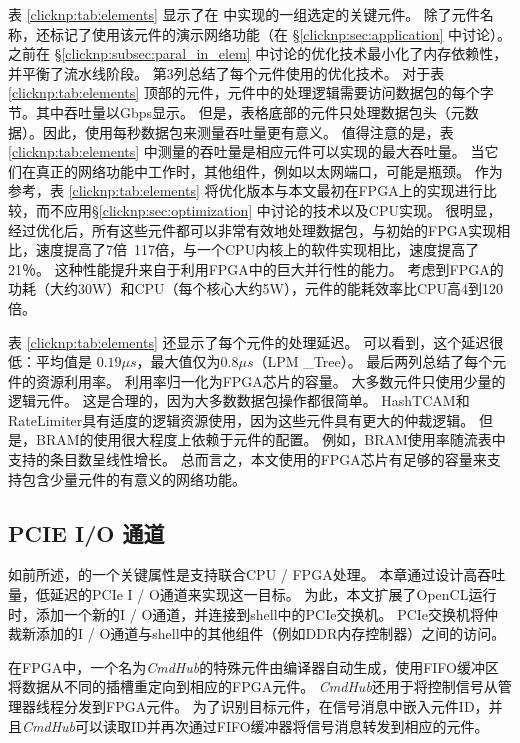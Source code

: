 表 \ref {clicknp:tab:elements} 显示了在 \name 中实现的一组选定的关键元件。
除了元件名称，还标记了使用该元件的演示网络功能（在 \S \ref {clicknp:sec:application} 中讨论）。
之前在 \S \ref {clicknp:subsec:paral_in_elem} 中讨论的优化技术最小化了内存依赖性，并平衡了流水线阶段。
第3列总结了每个元件使用的优化技术。
对于表 \ref {clicknp:tab:elements} 顶部的元件，元件中的处理逻辑需要访问数据包的每个字节。其中吞吐量以Gbps显示。
但是，表格底部的元件只处理数据包头（元数据）。因此，使用每秒数据包来测量吞吐量更有意义。
值得注意的是，表 \ref {clicknp:tab:elements} 中测量的吞吐量是相应元件可以实现的最大吞吐量。
当它们在真正的网络功能中工作时，其他组件，例如以太网端口，可能是瓶颈。
作为参考，表 \ref {clicknp:tab:elements} 将优化版本与本文最初在FPGA上的实现进行比较，而不应用\S \ref {clicknp:sec:optimization} 中讨论的技术以及CPU实现。
很明显，经过优化后，所有这些元件都可以非常有效地处理数据包，与初始的FPGA实现相比，速度提高了7倍~117倍，与一个CPU内核上的软件实现相比，速度提高了21％。
这种性能提升来自于利用FPGA中的巨大并行性的能力。
考虑到FPGA的功耗（大约30W）和CPU（每个核心大约5W），\name 元件的能耗效率比CPU高4到120倍。

表 \ref {clicknp:tab:elements} 还显示了每个元件的处理延迟。
可以看到，这个延迟很低：平均值是 $0.19 \mu s$，最大值仅为$0.8 \mu s$（LPM \_Tree）。
最后两列总结了每个元件的资源利用率。 利用率归一化为FPGA芯片的容量。
大多数元件只使用少量的逻辑元件。
这是合理的，因为大多数数据包操作都很简单。
HashTCAM和RateLimiter具有适度的逻辑资源使用，因为这些元件具有更大的仲裁逻辑。
但是，BRAM的使用很大程度上依赖于元件的配置。 例如，BRAM使用率随流表中支持的条目数呈线性增长。
总而言之，本文使用的FPGA芯片有足够的容量来支持包含少量元件的有意义的网络功能。



\subsection{PCIE I/O 通道}
\label{clicknp:subsec:pcie}

如前所述，\name 的一个关键属性是支持联合CPU / FPGA处理。
本章通过设计高吞吐量，低延迟的PCIe I / O通道来实现这一目标。
为此，本文扩展了OpenCL运行时，添加一个新的I / O通道，并连接到shell中的PCIe交换机。
PCIe交换机将仲裁新添加的I / O通道与shell中的其他组件（例如DDR内存控制器）之间的访问。

在FPGA中，一个名为\textit {CmdHub}的特殊元件由\name 编译器自动生成，使用FIFO缓冲区将数据从不同的插槽重定向到相应的FPGA元件。
\textit {CmdHub}还用于将控制信号从管理器线程分发到FPGA元件。
为了识别目标元件，在信号消息中嵌入元件ID，并且\textit {CmdHub}可以读取ID并再次通过FIFO缓冲器将信号消息转发到相应的元件。

